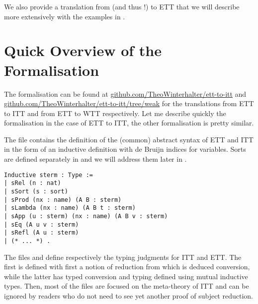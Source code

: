 We also provide a translation from \MetaCoq (and thus \Coq!) to \acrshort{ETT}
that we will describe more extensively with the examples in
.

\section{Quick Overview of the Formalisation}

The formalisation can be found at
\href{https://github.com/TheoWinterhalter/ett-to-itt}{github.com/TheoWinterhalter/ett-to-itt}
and
\href{https://github.com/TheoWinterhalter/ett-to-itt/tree/weak}{github.com/TheoWinterhalter/ett-to-itt/tree/weak}
for the translations from \acrshort{ETT} to \acrshort{ITT} and from
\acrshort{ETT} to \acrshort{WTT} respectively.
Let me describe quickly the formalisation in the case of \acrshort{ETT} to
\acrshort{ITT}, the other formalisation is pretty similar.

The file  contains the definition of the (common) abstract syntax
of \acrshort{ETT} and \acrshort{ITT} in the form of an inductive definition with
de Bruijn indices for variables.
Sorts are defined separately in  and we will address them later
in .

\begin{verbatim}
Inductive sterm : Type :=
| sRel (n : nat)
| sSort (s : sort)
| sProd (nx : name) (A B : sterm)
| sLambda (nx : name) (A B t : sterm)
| sApp (u : sterm) (nx : name) (A B v : sterm)
| sEq (A u v : sterm)
| sRefl (A u : sterm)
| (* ... *) .
\end{verbatim}

The files  and  define respectively the
typing judgments for \acrshort{ITT} and \acrshort{ETT}.
The first is defined with first a notion of reduction from which is deduced
conversion, while the latter has typed conversion and typing defined using
mutual inductive types.
Then, most of the files are focused on the meta-theory of \acrshort{ITT} and can
be ignored by readers who do not need to see yet another proof of subject
reduction.

